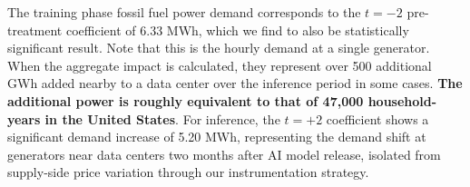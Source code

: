 \documentclass[a4paper,fleqn,longmktitle]{cas-sc}
\theoremstyle{plain}
\theoremstyle{definition}
\begin{document}

The training phase fossil fuel power demand corresponds to the $t=-2$ pre-treatment coefficient of $6.33$ MWh, which we find to also be statistically significant result. Note that this is the hourly demand at a single generator.  When the aggregate impact is calculated, they represent over 500 additional GWh added nearby to a data center over the inference period in some cases. \textbf{The additional power is roughly equivalent to that of 47,000 household-years in the United States}. For inference, the $t=+2$ coefficient shows a significant demand increase of 5.20 MWh, representing the demand shift at generators near data centers two months after AI model release, isolated from supply-side price variation through our instrumentation strategy. 




\end{document}
